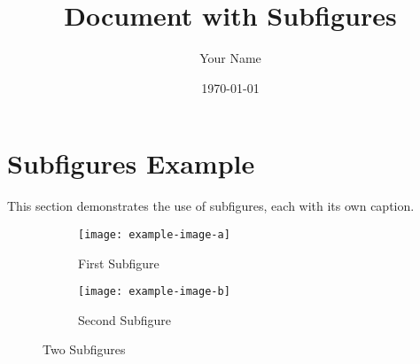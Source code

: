 \documentclass[11pt,a4paper]{article}
\title{Document with Subfigures}
\author{Your Name}
\date{\today}
\begin{document}
\maketitle

\section{Subfigures Example}
This section demonstrates the use of subfigures, each with its own caption.

\begin{figure}[h]
  \centering
  \begin{subfigure}[b]{0.4\textwidth}
    \texttt{[image: example-image-a]}
    \caption{First Subfigure}
    \label{fig:sub1}
  \end{subfigure}
  \hfill %
  \begin{subfigure}[b]{0.4\textwidth}
    \texttt{[image: example-image-b]}
    \caption{Second Subfigure}
    \label{fig:sub2}
  \end{subfigure}
  \caption{Two Subfigures}
  \label{fig:subfigures}
\end{figure}
\end{document}
